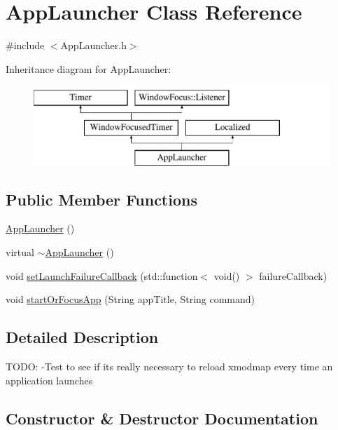 \hypertarget{classAppLauncher}{}\section{App\+Launcher Class Reference}
\label{classAppLauncher}


{\ttfamily \#include $<$App\+Launcher.\+h$>$}

Inheritance diagram for App\+Launcher\+:\begin{figure}[H]
\begin{center}
\leavevmode
\includegraphics[height=3.000000cm]{classAppLauncher}
\end{center}
\end{figure}
\subsection*{Public Member Functions}
\begin{DoxyCompactItemize}
\item 
\mbox{\hyperlink{classAppLauncher_ab8cea745a1599f66272c6ec20ce37686}{App\+Launcher}} ()
\item 
virtual \mbox{\hyperlink{classAppLauncher_a6ff63c24e2e4f4c73ea94ac87ccc29c3}{$\sim$\+App\+Launcher}} ()
\item 
void \mbox{\hyperlink{classAppLauncher_a6e5945c8a308b81109429d005792bde6}{set\+Launch\+Failure\+Callback}} (std\+::function$<$ void() $>$ failure\+Callback)
\item 
void \mbox{\hyperlink{classAppLauncher_aed24738d11e9685953c8ad772aeaf846}{start\+Or\+Focus\+App}} (String app\+Title, String command)
\end{DoxyCompactItemize}


\subsection{Detailed Description}
T\+O\+DO\+: -\/\+Test to see if it\textquotesingle{}s really necessary to reload xmodmap every time an application launches 

\subsection{Constructor \& Destructor Documentation}
\mbox{\label{classAppLauncher_ab8cea745a1599f66272c6ec20ce37686}} 
